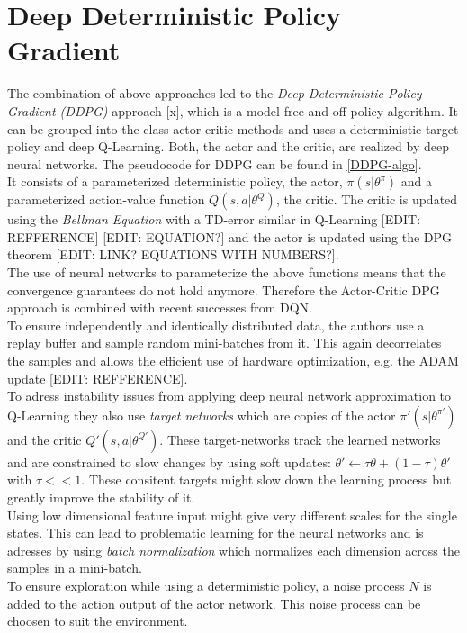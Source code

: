 \section{Deep Deterministic Policy Gradient}
\label{sec:DDPG}
\nocite{lillicrap2015continuous}
The combination of above approaches led to the \textit{Deep Deterministic Policy Gradient (DDPG)} approach [x], which is a model-free and off-policy algorithm. It can be grouped into the class actor-critic methods and uses a deterministic target policy and deep Q-Learning. Both, the actor and the critic, are realized by deep neural networks. The pseudocode for DDPG can be found in \ref{DDPG-algo}.\\
It consists of a parameterized deterministic policy, the actor, $\pi(s|\theta^\pi)$ and a parameterized action-value function $Q(s,a|\theta^Q)$, the critic. The critic is updated using the \textit{Bellman Equation} with a TD-error similar in Q-Learning [EDIT: REFFERENCE] [EDIT: EQUATION?] and the actor is updated using the DPG theorem [EDIT: LINK? EQUATIONS WITH NUMBERS?].\\
The use of neural networks to parameterize the above functions means that the convergence guarantees do not hold anymore. Therefore the Actor-Critic DPG approach is combined with recent successes from DQN.\\
To ensure independently and identically distributed data, the authors use a replay buffer and sample random mini-batches from it. This again decorrelates the samples and allows the efficient use of hardware optimization, e.g. the ADAM update [EDIT: REFFERENCE].\\
To adress instability issues from applying deep neural network approximation to Q-Learning they also use \textit{target networks} which are copies of the actor $\pi'(s|\theta^{\pi'})$ and the critic $Q'(s,a|\theta^{Q'})$. These target-networks track the learned networks and are constrained to slow changes by using soft updates: $\theta' \leftarrow \tau\theta + (1-\tau)\theta'$ with $\tau << 1$. These consitent targets might slow down the learning process but greatly improve the stability of it.\\
Using low dimensional feature input might give very different scales for the single states. This can lead to problematic learning for the neural networks and is adresses by using \textit{batch normalization} which normalizes each dimension across the samples in a mini-batch.\\
To ensure exploration while using a deterministic policy, a noise process $\mathit{N}$ is added to the action output of the actor network. This noise process can be choosen to suit the environment. 
